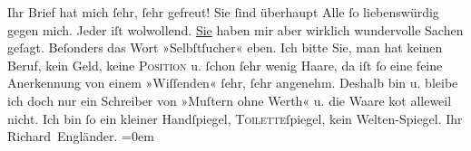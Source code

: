            \pstart
           Ihr Brief hat mich ſehr, ſehr gefreut! {\pb} Sie ſind überhaupt Alle ſo liebenswürdig gegen mich. Jeder iſt wolwollend. \uline{Sie} haben mir aber wirklich wundervolle Sachen geſagt.
               Beſonders das Wort »Selbſtſucher« eben.\pend
           \pstart
           Ich bitte Sie, man hat keinen Beruf, kein Geld, keine \textsc{Position} u. ſchon ſehr wenig Haare, da iſt ſo eine feine Anerkennung von
               einem »Wiſſenden« ſehr, ſehr angenehm.\pend
           \pstart
           Deshalb bin u. bleibe ich doch nur ein Schreiber von »Muſtern ohne Werth« u. die
               Waare ko{\geminationm}t alleweil nicht. Ich bin ſo ein kleiner
               Handſpiegel, \textsc{Toilette}ſpiegel, kein  Welten-Spiegel.\pend
           \pstart
           Ihr{\\[\baselineskip]}\spacefill\mbox{Richard Engländer.}\pend
           \leftskip=0em{}\endnumbering{}  
      